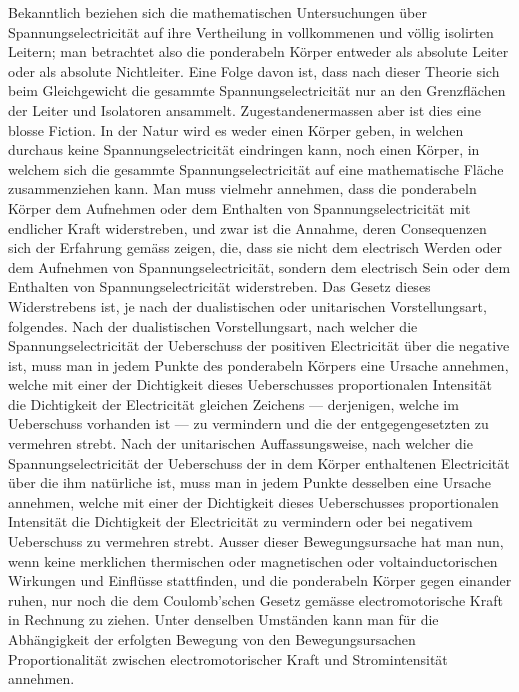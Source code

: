 \documentclass[12pt,a4paper]{book}
\theoremstyle{definition}
\theoremstyle{remark}
\begin{document}
Bekanntlich beziehen sich die mathematischen Untersuchungen über Spannungselectricität auf ihre Vertheilung in vollkommenen und völlig isolirten Leitern; man betrachtet also die ponderabeln Körper entweder als absolute Leiter oder als absolute Nichtleiter. Eine Folge davon ist, dass nach dieser Theorie sich beim Gleichgewicht die gesammte Spannungselectricität nur an den Grenzflächen der Leiter und Isolatoren ansammelt. Zugestandenermassen aber ist dies eine blosse Fiction. In der Natur wird es weder einen Körper geben, in welchen durchaus keine Spannungselectricität eindringen kann, noch einen Körper, in welchem sich die gesammte Spannungselectricität auf eine mathematische Fläche zusammenziehen kann. Man muss vielmehr annehmen, dass die ponderabeln Körper dem Aufnehmen oder dem Enthalten von Spannungselectricität mit endlicher Kraft widerstreben, und zwar ist die Annahme, deren Consequenzen sich der Erfahrung gemäss zeigen, die, dass sie nicht dem electrisch Werden oder dem Aufnehmen von Spannungselectricität, sondern dem electrisch Sein oder dem Enthalten von Spannungselectricität widerstreben. Das Gesetz dieses Widerstrebens ist, je nach der dualistischen oder unitarischen Vorstellungsart, folgendes. Nach der dualistischen Vorstellungsart, nach welcher die Spannungselectricität der Ueberschuss der positiven Electricität über die negative ist, muss man in jedem Punkte des ponderabeln Körpers eine Ursache annehmen, welche mit einer der Dichtigkeit dieses Ueberschusses proportionalen Intensität die Dichtigkeit der Electricität gleichen Zeichens --- derjenigen, welche im Ueberschuss vorhanden ist --- zu vermindern und die der entgegengesetzten zu vermehren strebt. Nach der unitarischen Auffassungsweise, nach welcher die Spannungselectricität der Ueberschuss der in dem Körper enthaltenen Electricität über die ihm natürliche ist, muss man in jedem Punkte desselben eine Ursache annehmen, welche mit einer der Dichtigkeit dieses Ueberschusses proportionalen Intensität die Dichtigkeit der Electricität zu vermindern oder bei negativem Ueberschuss zu vermehren strebt. Ausser dieser Bewegungsursache hat man nun, wenn keine merklichen thermischen oder magnetischen oder voltainductorischen Wirkungen und Einflüsse stattfinden, und die ponderabeln Körper gegen einander ruhen, nur noch die dem Coulomb'schen Gesetz gemässe electromotorische Kraft in Rechnung zu ziehen. Unter denselben Umständen kann man für die Abhängigkeit der erfolgten Bewegung von den Bewegungsursachen Proportionalität zwischen electromotorischer Kraft und Stromintensität annehmen.
\end{document}
